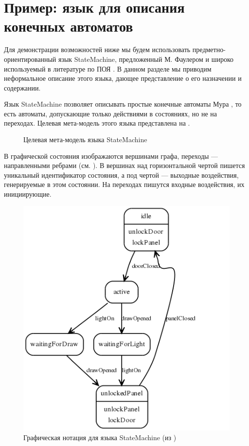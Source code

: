 \section{Пример: язык для описания конечных автоматов}

Для демонстрации возможностей  ниже мы будем использовать предметно-ориентированный язык StateMachine, предложенный М. Фаулером \cite{???} и широко используемый в литературе по ПОЯ \cite{???}. В данном разделе мы приводим неформальное описание этого языка, дающее представление о его назначении и содержании.

Язык StateMachine позволяет описывать простые конечные автоматы Мура \cite{???}, то есть автоматы, допускающие только действиями в состояниях, но не на переходах. Целевая мета-модель этого языка представлена на .

\begin{figure}[htbp]
	\caption{Целевая мета-модель языка StateMachine}\label{SMMM}
\end{figure}

В графической состояния изображаются вершинами графа, переходы --- направленными ребрами (см. ). В вершинах над горизонтальной чертой пишется уникальный идентификатор состояния, а под чертой --- выходные воздействия, генерируемые в этом состоянии. На переходах пишутся входные воздействия, их инициирующие.

\begin{figure}[htbp]
	\centering
	\includegraphics[scale=.7]{smgraph.png}
	\caption{Графическая нотация для языка StateMachine (из \cite{???})}\label{SM}
\end{figure}

